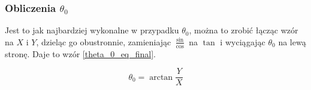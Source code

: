 \subsubsection{Obliczenia $\theta_0$}
Jest to jak najbardziej wykonalne w przypadku $\theta_0$, można to zrobić łącząc wzór na $X$ i $Y$, dzieląc go obustronnie, zamieniając $\frac{\sin}{\cos}$ na $\tan$ i wyciągając $\theta_0$ na lewą stronę. Daje to wzór \ref{theta_0_eq_final}.





\begin{equation} \label{theta_0_eq_final}
\theta_0 = \arctan{\frac{Y}{X}}
\end{equation}








